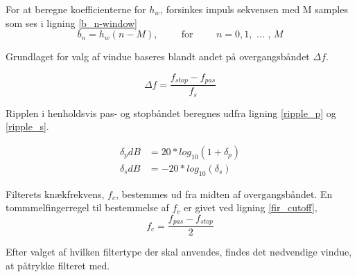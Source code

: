 For at beregne koefficienterne for $h_w$, forsinkes impuls sekvensen med M samples som ses i ligning \ref{b_n-window}
\begin{equation}
	b_n = h_w (n-M), \hspace{1cm} \text{for} \hspace{1cm} n = 0,1, \text{ ... , }M \label{b_n-window} 
\end{equation}

Grundlaget for valg af vindue baseres blandt andet på overgangsbåndet $\Delta f$.

\begin{equation}
\Delta f = \frac{f_{stop}-f_{pas}}{f_s} \label{Windows_transistionband}
\end{equation}

Ripplen i henholdsvis pas- og stopbåndet beregnes udfra ligning \ref{ripple_p} og \ref{ripple_s}.

\begin{align}
\delta_p dB &= 20*log_{10}(1+\delta_p) \label{ripple_p}\\
\delta_s dB &= -20*log_{10}(\delta_s) \label{ripple_s}
\end{align}

Filterets knækfrekvens, $f_c$, bestemmes ud fra midten af overgangsbåndet. En tommmelfingerregel til bestemmelse af $f_c$ er givet ved ligning \ref{fir_cutoff},
\begin{equation}
	f_c =\frac{f_{pas}-f_{stop}}{2} \label{fir_cutoff}
\end{equation}


Efter valget af hvilken filtertype der skal anvendes, findes det nødvendige vindue, at påtrykke filteret med.

